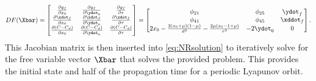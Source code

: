 \begin{equation}
    DF(\Xbar)=\begin{bmatrix}   \frac{\partial y_{f}}{\partial x_{0}}                                       &   \frac{\partial y_{f}}{\partial\ydot_{0}}    &   \frac{\partial y_{f}}{\partial\tau}     \\
                                \frac{\partial\xdot_{f}}{\partial x_{0}}                                    &   \frac{\partial\xdot_{f}}{\partial\ydot_{0}} &   \frac{\partial\xdot_{f}}{\partial\tau}  \\
                                \frac{\partial(C-C_{d})}{\partial x_{0}}                                    &   \frac{\partial(C-C_{d})}{\partial\ydot_{0}} &   \frac{\partial(C-C_{d})}{\partial\tau}  \end{bmatrix}
             =\begin{bmatrix}   \phi_{21}                                                                   &   \phi_{25}                                   &   \ydot_{f}                               \\
                                \phi_{41}                                                                   &   \phi_{45}                                   &   \xddot_{f}                              \\
                                2x_{0}-\frac{2(x_{0}+\mu)(1-\mu)}{d^{3}}-\frac{2\mu(x_{0}-1+\mu)}{r^{3}}    &   -2\ydot_{0}                                 &   0                                       \end{bmatrix}.
    \label{eq:Lyapunovjacobian}
\end{equation}
This Jacobian matrix is then inserted into \cref{eq:NRsolution} to iteratively solve for the free
variable vector $\Xbar$ that solves the provided problem. This provides the initial state and half
of the propagation time for a periodic Lyapunov orbit.

